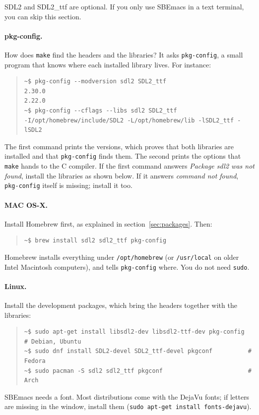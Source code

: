 \documentclass[a4paper,12pt,openany]{book}
\begin{document}
SDL2 and SDL2\_ttf are optional. If you only use SBEmacs in a text
terminal, you can skip this section.

\paragraph{pkg-config.} How does \verb|make| find the headers and the
libraries? It asks \verb|pkg-config|, a small program that knows where each
installed library lives. For instance:
\begin{quote}
\begin{verbatim}
~$ pkg-config --modversion sdl2 SDL2_ttf
2.30.0
2.22.0
~$ pkg-config --cflags --libs sdl2 SDL2_ttf
-I/opt/homebrew/include/SDL2 -L/opt/homebrew/lib -lSDL2_ttf -lSDL2
\end{verbatim}
\end{quote}
The first command prints the versions, which proves that both libraries
are installed and that \verb|pkg-config| finds them. The second prints the
options that \verb|make| hands to the C compiler. If the first command
answers {\em Package sdl2 was not found}, install the libraries as shown
below. If it answers {\em command not found}, \verb|pkg-config| itself is
missing; install it too.

\paragraph{MAC OS-X.} Install Homebrew first, as explained in
section~\ref{sec:packages}. Then:
\begin{quote}
\begin{verbatim}
~$ brew install sdl2 sdl2_ttf pkg-config
\end{verbatim}
\end{quote}
Homebrew installs everything under \verb|/opt/homebrew| (or
\verb|/usr/local| on older Intel Macintosh computers), and tells
\verb|pkg-config| where. You do not need \verb|sudo|.

\paragraph{Linux.} Install the development packages, which bring the
headers together with the libraries:
\begin{quote}
\begin{verbatim}
~$ sudo apt-get install libsdl2-dev libsdl2-ttf-dev pkg-config  # Debian, Ubuntu
~$ sudo dnf install SDL2-devel SDL2_ttf-devel pkgconf          # Fedora
~$ sudo pacman -S sdl2 sdl2_ttf pkgconf                        # Arch
\end{verbatim}
\end{quote}
SBEmacs needs a font. Most distributions come with the DejaVu fonts;
if letters are missing in the window, install them
(\verb|sudo apt-get install fonts-dejavu|).
\end{document}
